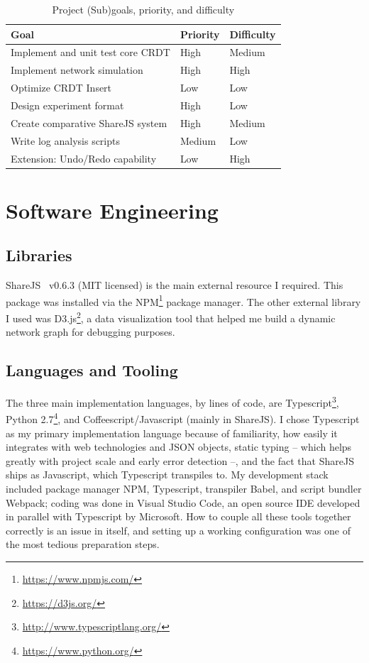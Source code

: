 \documentclass[12pt,a4paper,twoside,openright]{report}
\begin{document}
\begin{center}
\begin{table}[H]
\centering
\caption{Project (Sub)goals, priority, and difficulty}
\label{table: goals}
\begin{tabular}{@{}lll@{}}
Goal											 	& Priority & Difficulty \\ \toprule
Implement and unit test core CRDT                	& High     & Medium \\ \midrule
Implement network simulation                     	& High     & High   \\ \midrule
Optimize CRDT Insert                             	& Low      & Low    \\ \midrule
Design experiment format                         	& High     & Low    \\ \midrule
Create comparative ShareJS system					& High     & Medium \\ \midrule
Write log analysis scripts                       	& Medium   & Low    \\ \midrule
Extension: Undo/Redo capability						& Low	   & High 	\\ \bottomrule
\end{tabular}
\end{table}
\end{center}



\section{Software Engineering}

	\subsection{Libraries}
	ShareJS~\cite{sharejs} v0.6.3 (MIT licensed) is the main external resource I required. This package was installed via the NPM\footnote{\url{https://www.npmjs.com/}} package manager. The other external library I used was D3.js\footnote{\url{https://d3js.org/}}, a data visualization tool that helped me build a dynamic network graph for debugging purposes.
	
	\subsection{Languages and Tooling}
	The three main implementation languages, by lines of code, are Typescript\footnote{\url{http://www.typescriptlang.org/}}, Python 2.7\footnote{\url{https://www.python.org/}}, and Coffeescript/Javascript (mainly in ShareJS). I chose Typescript as my primary implementation language because of familiarity, how easily it integrates with web technologies and JSON objects, static typing -- which helps greatly with project scale and early error detection --, and the fact that ShareJS ships as Javascript, which Typescript transpiles to. My development stack included package manager NPM, Typescript, transpiler Babel, and script bundler Webpack; coding was done in Visual Studio Code, an open source IDE developed in parallel with Typescript by Microsoft. How to couple all these tools together correctly is an issue in itself, and setting up a working configuration was one of the most tedious preparation steps.
	
\end{document}
